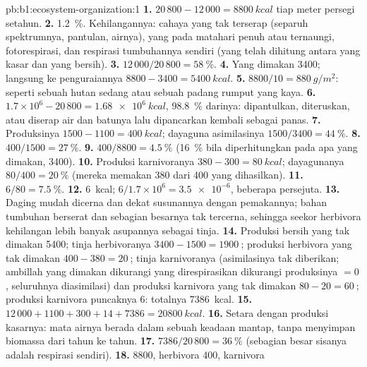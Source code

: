 \begin{solution}{pb:b1:ecosystem-organization:1}
\textbf{1.} $20\,800 - 12\,000 = \qty{8800}{kcal}$ tiap meter persegi
setahun.
\textbf{2.} \qty{1.2}{\%}. Kehilangannya: cahaya yang tak terserap
(separuh spektrumnya, pantulan, airnya),  yang  pada matahari
penuh atau ternaungi, fotorespirasi, dan respirasi tumbuhannya sendiri
(yang telah dihitung antara yang kasar dan yang bersih).
\textbf{3.} $12\,000/20\,800 = \qty{58}{\%}$.
\textbf{4.} Yang dimakan \qty{3400}{}; langsung ke penguraiannya
$8800 - 3400 = \qty{5400}{kcal}$.
\textbf{5.} $8800/10 = \qty{880}{g/m^2}$: seperti sebuah hutan sedang
atau sebuah padang rumput yang kaya.
\textbf{6.} $1.7\times 10^6 - 20\,800 = \qty{1.68e6}{kcal}$, \qty{98.8}{\%}
darinya: dipantulkan, diteruskan, atau diserap air dan batunya lalu
dipancarkan kembali sebagai panas.
\textbf{7.} Produksinya $1500 - 1100 = \qty{400}{kcal}$; dayaguna
asimilasinya $1500/3400 = \qty{44}{\%}$.
\textbf{8.} $400/1500 = \qty{27}{\%}$.
\textbf{9.} $400/8800 = \qty{4.5}{\%}$ (\qty{16}{\%} bila diperhitungkan
pada apa yang dimakan, \qty{3400}{}).
\textbf{10.} Produksi karnivoranya $380 - 300 = \qty{80}{kcal}$;
dayagunanya $80/400 = \qty{20}{\%}$ (mereka memakan \qty{380}{} dari
\qty{400}{} yang dihasilkan).
\textbf{11.} $6/80 = \qty{7.5}{\%}$.
\textbf{12.} \qty{6}{kcal}; $6/1.7\times 10^6 = \num{3.5e-6}$, beberapa
persejuta.
\textbf{13.} Daging mudah dicerna dan dekat susunannya dengan
pemakannya; bahan tumbuhan berserat dan sebagian besarnya tak tercerna,
sehingga seekor herbivora kehilangan lebih banyak asupannya sebagai
tinja.
\textbf{14.} Produksi bersih yang tak dimakan \qty{5400}{}; tinja
herbivoranya $3400 - 1500 = \qty{1900}{}$; produksi herbivora yang tak
dimakan $400 - 380 = \qty{20}{}$; tinja karnivoranya (asimilasinya tak
diberikan; ambillah yang dimakan dikurangi yang direspirasikan
dikurangi produksinya $= 0$, seluruhnya diasimilasi) dan produksi
karnivora yang tak dimakan $80 - 20 = \qty{60}{}$; produksi karnivora
puncaknya \qty{6}{}: totalnya \qty{7386}{kcal}.
\textbf{15.} $12\,000 + 1100 + 300 + 14 + 7386 = \qty{20800}{kcal}$.
\textbf{16.} Setara dengan produksi kasarnya: mata airnya berada dalam
sebuah keadaan mantap, tanpa menyimpan biomassa dari tahun ke tahun.
\textbf{17.} $7386/20\,800 = \qty{36}{\%}$ (sebagian besar sisanya
adalah respirasi  sendiri).
\textbf{18.}  \qty{8800}{}, herbivora \qty{400}{}, karnivora

\end{solution}
